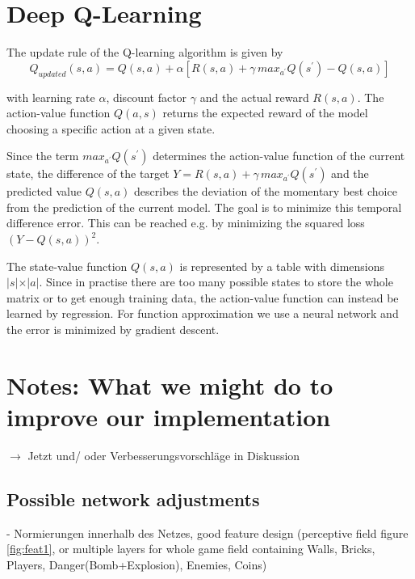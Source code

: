\documentclass[a4paper ,12pt]{report}
\begin{document}
	\section*{Deep Q-Learning}
	The update rule of the Q-learning algorithm is given by
	\begin{equation}
	Q_{updated}(s,a) = Q(s,a) + \alpha\left[R(s,a) + \gamma \, max_{a^{\prime}} Q\left(s^{\prime}\right) - Q(s,a)\right]
	\end{equation}

	with learning rate $\alpha$, discount factor $\gamma$ and the actual reward $R(s,a)$. The action-value function $Q(a,s)$ returns the expected reward of the model choosing a specific action at a given state.
	
	Since the term $max_{a^{\prime}} Q\left(s^{\prime}\right)$ determines the action-value function of the current state, the difference of the target $Y = R(s,a) + \gamma \, max_{a^{\prime}} Q\left(s^{\prime}\right)$ and the predicted value $Q(s,a)$ describes the deviation of the momentary best choice from the prediction of the current model. The goal is to minimize this temporal difference error. This can be reached e.g. by minimizing the squared loss $(Y-Q(s,a))^2$.\cite{UBHD-68505368}
	
	\vspace{0.5cm}
	
	The state-value function $Q(s, a)$ is represented by a table with dimensions $\lvert s \lvert \times \lvert a \lvert $. Since in practise there are too many possible states to store the whole matrix or to get enough training data, the action-value function can instead be learned by regression. For function approximation we use a neural network and the error is minimized by gradient descent. \cite{Lecture}
	
	\newpage
	
	\section*{Notes: What we might do to improve our implementation}
	$\rightarrow$ Jetzt und/ oder Verbesserungsvorschläge in Diskussion
	
	\subsection*{Possible network adjustments}
	
	- Normierungen innerhalb des Netzes, good feature design (perceptive field figure \ref{fig:feat1}, or multiple layers for whole game field containing Walls, Bricks, Players, Danger(Bomb+Explosion), Enemies, Coins)
	
\end{document}
